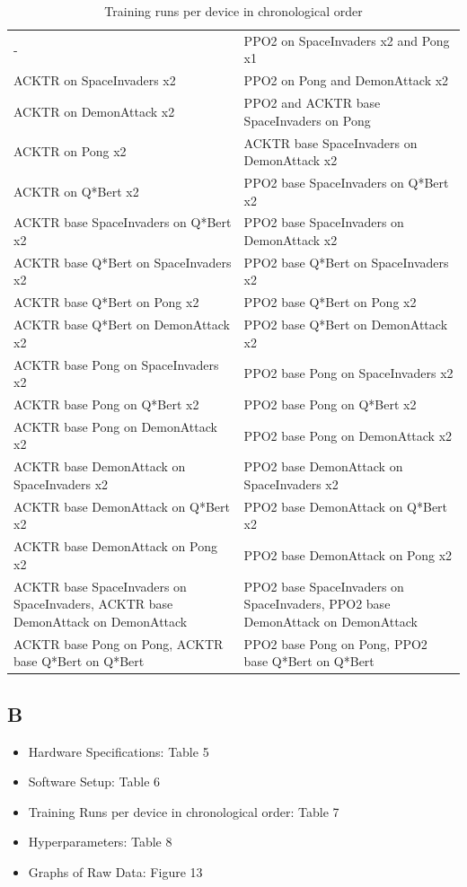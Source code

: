 \begin{table}[]
	\begin{tabular}{|p{7cm}|p{7cm}|}
		\hline
		\thead{Device 1} & \thead{Device 2} \\ \hline
		- & PPO2 on SpaceInvaders x2 and Pong x1 \\ \hline
		ACKTR on SpaceInvaders x2 & PPO2 on Pong and DemonAttack x2 \\ \hline
		ACKTR on DemonAttack x2 & PPO2 and ACKTR base SpaceInvaders on Pong \\ \hline
		ACKTR on Pong x2 & ACKTR base SpaceInvaders on DemonAttack x2 \\ \hline
		ACKTR on Q*Bert x2 & PPO2 base SpaceInvaders on Q*Bert x2 \\ \hline
		ACKTR base SpaceInvaders on Q*Bert x2 & PPO2 base SpaceInvaders on DemonAttack x2 \\ \hline
		ACKTR base Q*Bert on SpaceInvaders x2 & PPO2 base Q*Bert on SpaceInvaders x2 \\ \hline
		ACKTR base Q*Bert on Pong x2 & PPO2 base Q*Bert on Pong x2 \\ \hline
		ACKTR base Q*Bert on DemonAttack x2 & PPO2 base Q*Bert on DemonAttack x2 \\ \hline
		ACKTR base Pong on SpaceInvaders x2 & PPO2 base Pong on SpaceInvaders x2 \\ \hline
		ACKTR base Pong on Q*Bert x2 & PPO2 base Pong on Q*Bert x2 \\ \hline
		ACKTR base Pong on DemonAttack x2 & PPO2 base Pong on DemonAttack x2 \\ \hline
		ACKTR base DemonAttack on SpaceInvaders x2 & PPO2 base DemonAttack on SpaceInvaders x2 \\ \hline
		ACKTR base DemonAttack on Q*Bert x2 & PPO2 base DemonAttack on Q*Bert x2 \\ \hline
		ACKTR base DemonAttack on Pong x2 & PPO2 base DemonAttack on Pong x2 \\ \hline
		ACKTR base SpaceInvaders on SpaceInvaders, ACKTR base DemonAttack on DemonAttack & PPO2 base SpaceInvaders on SpaceInvaders, PPO2 base DemonAttack on DemonAttack \\ \hline
		ACKTR base Pong on Pong, ACKTR base Q*Bert on Q*Bert & PPO2 base Pong on Pong, PPO2 base Q*Bert on Q*Bert \\ \hline
	\end{tabular}
\caption{Training runs per device in chronological order}
\end{table}


\subsection*{B}
\begin{itemize}
	\item Hardware Specifications: Table 5
	\item Software Setup: Table 6
	\item Training Runs per device in chronological order: Table 7
	\item Hyperparameters: Table 8
	\item Graphs of Raw Data: Figure 13
\end{itemize}

